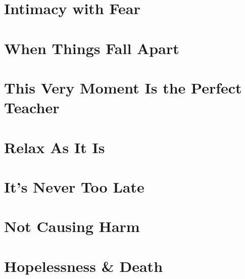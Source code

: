 \documentclass[oneside]{book}
\numberwithin{equation}{section}
\begin{document}

\section{Intimacy with Fear}


\section{When Things Fall Apart}


\section{This Very Moment Is the Perfect Teacher}


\section{Relax As It Is}


\section{It's Never Too Late}


\section{Not Causing Harm}


\section{Hopelessness \& Death}

\end{document}
